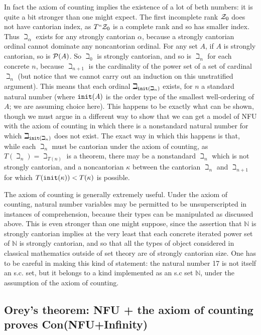 \documentclass[12pt]{article}
\begin{document}
In fact the axiom of counting implies the existence of a lot of beth numbers:  it is quite a bit stronger than one might expect.  The first incomplete rank ${\cal Z}_0$ does not have cantorian index, as $T``{\cal Z}_0$ is a complete rank and so has smaller index.  Thus $\beth_\alpha$ exists for any strongly cantorian $\alpha$, because a strongly cantorian ordinal cannot dominate any noncantorian ordinal.  For any set $A$, if $A$ is strongly cantorian, so is ${\cal P}(A)$.  So $\beth_0$ is strongly
cantorian, and so is $\beth_n$ for each concrete $n$, because $\beth_{n+1}$ is the cardinality of the power set of a set of cardinal $\beth_n$ (but notice that we cannot carry out an induction on this unstratified argument).  This means
that each ordinal $\beth_{{\tt init}(\beth_n)}$ exists, for $n$ a standard natural number (where ${\tt init}(A)$ is the order type of the smallest well-ordering of $A$;  we are assuming choice here).  This happens to be exactly what can be shown, though we must argue in a different way to show that we can get a model of NFU with the axiom of counting in which there is a nonstandard natural number for which $\beth_{{\tt init}(\beth_n)}$ does not exist.  The exact way in which this happens
is that, while each $\beth_n$ must be cantorian under the axiom of counting, as $T(\beth_n) = \beth_{T(n)}$ is a theorem, there may be a nonstandard $\beth_n$ which is not strongly cantorian, and a noncantorian $\kappa$ between
the cantorian $\beth_n$ and $\beth_{n+1}$ for which $T({\tt init}(\kappa)) < T(\kappa)$ is possible.

The axiom of counting is generally extremely useful.  Under the axiom of counting, natural number variables may be permitted to be unsuperscripted in instances of comprehension, because their types can be manipulated as discussed above.  This is even stronger than one might suppose, since the assertion that $\mathbb N$ is strongly cantorian implies at the very least that each concrete  iterated power set of $\mathbb N$ is strongly cantorian, and so that all the types of object considered in  classical mathematics outside of set theory are of strongly cantorian size.  One has to be careful in making this kind of statement:  the natural number 17 is not itself an s.c. set, but it belongs to a kind implemented as an s.c set $\mathbb N$, under the assumption of the axiom of counting.

\subsection{Orey's theorem:  NFU + the axiom of counting proves Con(NFU+Infinity)}
\end{document}
